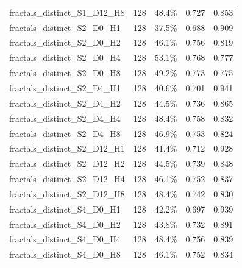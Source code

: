 \documentclass[11pt]{article}
\begin{document}
\begin{longtable}{p{}rrrr}
fractals\_\allowbreak{}distinct\_\allowbreak{}S1\_\allowbreak{}D12\_\allowbreak{}H8 & 128 & 48.4\% & 0.727 & 0.853\\
fractals\_\allowbreak{}distinct\_\allowbreak{}S2\_\allowbreak{}D0\_\allowbreak{}H1 & 128 & 37.5\% & 0.688 & 0.909\\
fractals\_\allowbreak{}distinct\_\allowbreak{}S2\_\allowbreak{}D0\_\allowbreak{}H2 & 128 & 46.1\% & 0.756 & 0.819\\
fractals\_\allowbreak{}distinct\_\allowbreak{}S2\_\allowbreak{}D0\_\allowbreak{}H4 & 128 & 53.1\% & 0.768 & 0.777\\
fractals\_\allowbreak{}distinct\_\allowbreak{}S2\_\allowbreak{}D0\_\allowbreak{}H8 & 128 & 49.2\% & 0.773 & 0.775\\
fractals\_\allowbreak{}distinct\_\allowbreak{}S2\_\allowbreak{}D4\_\allowbreak{}H1 & 128 & 40.6\% & 0.701 & 0.941\\
fractals\_\allowbreak{}distinct\_\allowbreak{}S2\_\allowbreak{}D4\_\allowbreak{}H2 & 128 & 44.5\% & 0.736 & 0.865\\
fractals\_\allowbreak{}distinct\_\allowbreak{}S2\_\allowbreak{}D4\_\allowbreak{}H4 & 128 & 48.4\% & 0.758 & 0.832\\
fractals\_\allowbreak{}distinct\_\allowbreak{}S2\_\allowbreak{}D4\_\allowbreak{}H8 & 128 & 46.9\% & 0.753 & 0.824\\
fractals\_\allowbreak{}distinct\_\allowbreak{}S2\_\allowbreak{}D12\_\allowbreak{}H1 & 128 & 41.4\% & 0.712 & 0.928\\
fractals\_\allowbreak{}distinct\_\allowbreak{}S2\_\allowbreak{}D12\_\allowbreak{}H2 & 128 & 44.5\% & 0.739 & 0.848\\
fractals\_\allowbreak{}distinct\_\allowbreak{}S2\_\allowbreak{}D12\_\allowbreak{}H4 & 128 & 46.1\% & 0.752 & 0.837\\
fractals\_\allowbreak{}distinct\_\allowbreak{}S2\_\allowbreak{}D12\_\allowbreak{}H8 & 128 & 48.4\% & 0.742 & 0.830\\
fractals\_\allowbreak{}distinct\_\allowbreak{}S4\_\allowbreak{}D0\_\allowbreak{}H1 & 128 & 42.2\% & 0.697 & 0.939\\
fractals\_\allowbreak{}distinct\_\allowbreak{}S4\_\allowbreak{}D0\_\allowbreak{}H2 & 128 & 43.8\% & 0.732 & 0.891\\
fractals\_\allowbreak{}distinct\_\allowbreak{}S4\_\allowbreak{}D0\_\allowbreak{}H4 & 128 & 48.4\% & 0.756 & 0.839\\
fractals\_\allowbreak{}distinct\_\allowbreak{}S4\_\allowbreak{}D0\_\allowbreak{}H8 & 128 & 46.1\% & 0.752 & 0.834\\

\end{longtable}
\end{document}
